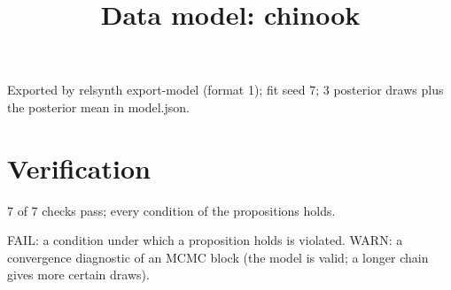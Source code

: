\documentclass[10pt]{article}
\begin{document}
\title{Data model: chinook}
\date{}
\maketitle
\small

Exported by relsynth export-model (format 1); fit seed 7; 3 posterior draws plus the posterior mean in model.json.

\section*{Verification}

7 of 7 checks pass; every condition of the propositions holds.

FAIL: a condition under which a proposition holds is violated.  WARN: a convergence diagnostic of an MCMC block (the model is valid; a longer chain gives more certain draws).
\end{document}
